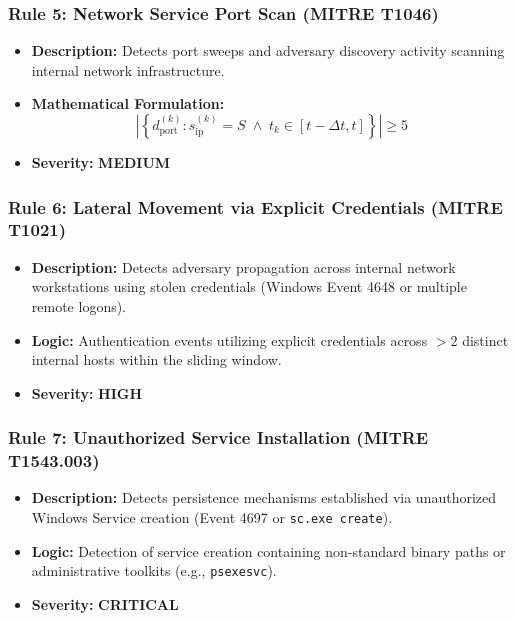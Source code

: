 \documentclass[11pt,a4paper]{article}
\begin{document}
\subsubsection{Rule 5: Network Service Port Scan (MITRE T1046)}
\begin{itemize}
    \item \textbf{Description:} Detects port sweeps and adversary discovery activity scanning internal network infrastructure.
    \item \textbf{Mathematical Formulation:}
    \begin{equation}
        \left| \left\{ d_{\text{port}}^{(k)} : s_{\text{ip}}^{(k)} = S \;\land\; t_k \in [t - \Delta t, t] \right\} \right| \ge 5
    \end{equation}
    \item \textbf{Severity:} \textbf{MEDIUM}
\end{itemize}

\subsubsection{Rule 6: Lateral Movement via Explicit Credentials (MITRE T1021)}
\begin{itemize}
    \item \textbf{Description:} Detects adversary propagation across internal network workstations using stolen credentials (Windows Event 4648 or multiple remote logons).
    \item \textbf{Logic:} Authentication events utilizing explicit credentials across $> 2$ distinct internal hosts within the sliding window.
    \item \textbf{Severity:} \textcolor{alertorange}{\textbf{HIGH}}
\end{itemize}

\subsubsection{Rule 7: Unauthorized Service Installation (MITRE T1543.003)}
\begin{itemize}
    \item \textbf{Description:} Detects persistence mechanisms established via unauthorized Windows Service creation (Event 4697 or \texttt{sc.exe create}).
    \item \textbf{Logic:} Detection of service creation containing non-standard binary paths or administrative toolkits (e.g., \texttt{psexesvc}).
    \item \textbf{Severity:} \textcolor{criticalred}{\textbf{CRITICAL}}
\end{itemize}
\end{document}
